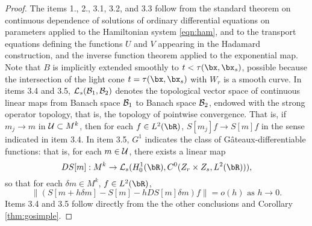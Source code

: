 \begin{proof}
The items 1., 2., 3.1, 3.2, and 3.3 follow from the standard theorem
  on continuous dependence of solutions of ordinary differential
  equations on parameters applied to the Hamiltonian system
  \ref{eqn:ham}, and to the transport equations defining the functions
  $U$ and $V$ appearing in the Hadamard construction, and the inverse
  function theorem applied to the exponential map. Note that $B$ is
  implicitly extended smoothly to $t < \tau(\bx,\bx_s)$, possible
  because the intersection of the light cone $t=\tau(\bx,\bx_s)$ with
  $W_r$ is a smooth curve. In items 3.4 and
  3.5, ${\cal L}_s({\cal B}_1,{\cal B}_2)$ denotes the topological
  vector space of continuous linear maps from Banach space
  ${\cal B}_1$ to Banach space $ {\cal B}_2$, endowed with the strong
  operator topology, that is, the topology of pointwise
  convergence. That is, if $m_j \rightarrow m$ in
  ${\cal U} \subset M^k$, then for each $f \in L^2(\bR)$,
  $S[m_j]f \rightarrow S[m]f$ in the sense indicated in item
  3.4. In item 3.5, $G^1$ indicates the class of
  G\^{a}teaux-differentiable functions: that is, for each $m \in {\cal
    U}$, there exists a linear map 
\[
DS[m]: M^k \rightarrow {\cal L}_s(H^1_0(\bR),
C^0(Z_r\times Z_s,L^2(\bR))),
\]
so that for each $\delta m \in M^k$, $f \in L^2(\bR)$,
\[
\|(S[m + h\delta m]-S[m]-hDS[m]\delta m) f \| = o(h) \mbox{ as }
h\rightarrow 0.
\]
Items 3.4 and 3.5 follow directly from the the other
  conclusions and Corollary \ref{thm:gosimple}.
\end{proof}

